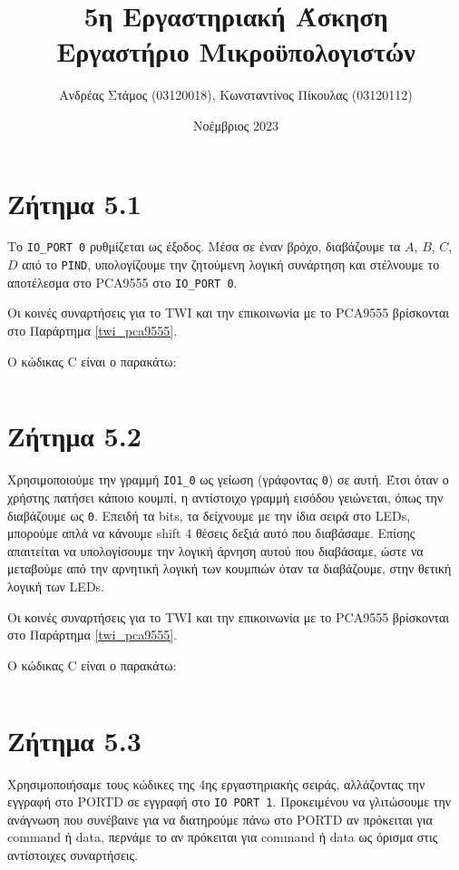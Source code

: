 \documentclass[a4paper]{article}
\title{5η Εργαστηριακή Άσκηση\\Εργαστήριο Μικροϋπολογιστών}
\author{Ανδρέας Στάμος (03120018), Κωνσταντίνος Πίκουλας (03120112)}
\date{Νοέμβριος 2023}
\begin{document}
\maketitle
\tableofcontents

\section{Ζήτημα 5.1}

\par Το \texttt{IO\_PORT 0} ρυθμίζεται ως έξοδος. Μέσα σε έναν βρόχο, διαβάζουμε τα $A$, $B$, $C$, $D$ από το \texttt{PIND},
υπολογίζουμε την ζητούμενη λογική συνάρτηση και στέλνουμε το αποτέλεσμα στο PCA9555 στο \texttt{IO\_PORT 0}.

\par Οι κοινές συναρτήσεις για το TWI και την επικοινωνία με το PCA9555 βρίσκονται στο Παράρτημα \ref{twi_pca9555}.

\par Ο κώδικας C είναι ο παρακάτω:
\inputminted[breaklines, linenos]{c}{../Lab5.1/main.c}

\section{Ζήτημα 5.2}

\par Χρησιμοποιούμε την γραμμή \texttt{IO1\_0} ως γείωση (γράφοντας \texttt{0}) σε αυτή. Έτσι όταν ο χρήστης πατήσει κάποιο κουμπί,
η αντίστοιχο γραμμή εισόδου γειώνεται, όπως την διαβάζουμε ως \texttt{0}. Επειδή τα bits, τα δείχνουμε με την ίδια σειρά στο LEDs,
μπορούμε απλά να κάνουμε shift 4 θέσεις δεξιά αυτό που διαβάσαμε. Επίσης απαιτείται να υπολογίσουμε την λογική άρνηση αυτού που διαβάσαμε,
ώστε να μεταβούμε από την αρνητική λογική των κουμπιών όταν τα διαβάζουμε, στην θετική λογική των LEDs.

\par Οι κοινές συναρτήσεις για το TWI και την επικοινωνία με το PCA9555 βρίσκονται στο Παράρτημα \ref{twi_pca9555}.

\par Ο κώδικας C είναι ο παρακάτω:
\inputminted[breaklines, linenos]{c}{../Lab5.2/main.c}

\section{Ζήτημα 5.3}
\par Χρησιμοποιήσαμε τους κώδικες της 4ης εργαστηριακής σειράς, αλλάζοντας την εγγραφή στο PORTD σε εγγραφή στο \texttt{IO PORT 1}.
Προκειμένου να γλιτώσουμε την ανάγνωση που συνέβαινε για να διατηρούμε πάνω στο PORTD αν πρόκειται για command ή data, περνάμε το
αν πρόκειται για command ή data ως όρισμα στις αντίστοιχες συναρτήσεις.
\end{document}
